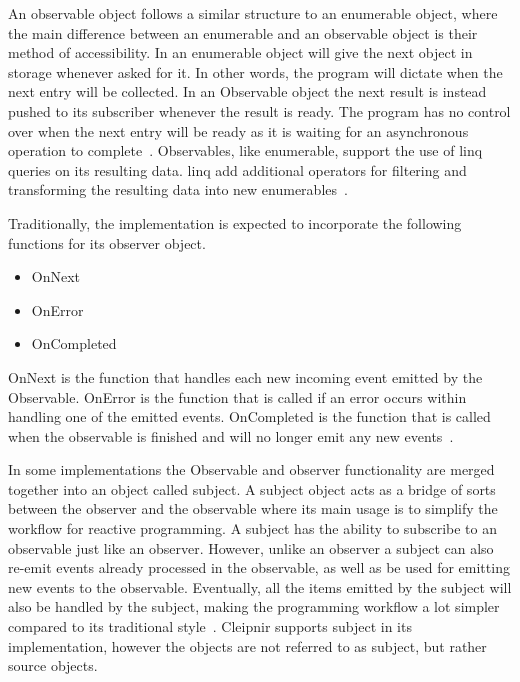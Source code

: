 An observable object follows a similar structure to an enumerable object, where the main difference between an enumerable and an observable object is their method of accessibility. In an enumerable object will give the next object in storage whenever asked for it. In other words, the program will dictate when the next entry will be collected. In an Observable object the next result is instead pushed to its subscriber whenever the result is ready. The program has no control over when the next entry will be ready as it is waiting for an asynchronous operation to complete~\cites{WEB:ReactiveObservable, VIDEO:dotnetsheffReactive, VIDEO:MicroDev}[p.~15]{BOOK:RxLinq}. Observables, like enumerable, support the use of \ac{linq} queries on its resulting data. \ac{linq} add additional operators for filtering and transforming the resulting data into new enumerables~\cites{VIDEO:dotnetsheffReactive}[p.~3-4]{BOOK:RxLinq}[p.~208]{BOOK:DotnetMultithreadCookBook}.

Traditionally, the implementation is expected to incorporate the following functions for its observer object.
\begin{itemize}
	\item{OnNext}
	\item{OnError}
	\item{OnCompleted}
\end{itemize}

OnNext is the function that handles each new incoming event emitted by the Observable. OnError is the function that is called if an error occurs within handling one of the emitted events. OnCompleted is the function that is called when the observable is finished and will no longer emit any new events~\cite{WEB:ReactiveObservable}.

In some implementations the Observable and observer functionality are merged together into an object called subject. A subject object acts as a bridge of sorts between the observer and the observable where its main usage is to simplify the workflow for reactive programming. A subject has the ability to subscribe to an observable just like an observer. However, unlike an observer a subject can also re-emit events already processed in the observable, as well as be used for emitting new events to the observable. Eventually, all the items emitted by the subject will also be handled by the subject, making the programming workflow a lot simpler compared to its traditional style~\cite{WEB:ReactiveSubject}. Cleipnir supports subject in its implementation, however the objects are not referred to as subject, but rather source objects.

\iffalse
-a brief introduce reactive programming
-usecase
-the ReactiveX library(what it does, how it works and the mention Rx.Net)
-give brief through workflow, concepts with name and definitions and how it works.(Observable, stream of data, subjects, event driven programming)
-mention briefly Cleipnir support for reactive programming, how they differ, say detail information is given in Cleipnir chapter.
\fi
